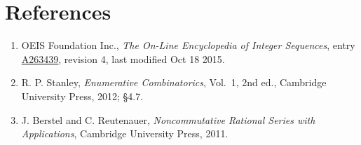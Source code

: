 \documentclass[11pt]{article}
\theoremstyle{definition}
\begin{document}
\section{References}

\begin{enumerate}

\item OEIS Foundation Inc., \emph{The On-Line Encyclopedia of Integer Sequences}, entry \href{https://oeis.org/A263439}{A263439}, revision 4, last modified Oct 18 2015.

\item R. P. Stanley, \emph{Enumerative Combinatorics}, Vol.~1, 2nd ed., Cambridge University Press, 2012; \S4.7.

\item J. Berstel and C. Reutenauer, \emph{Noncommutative Rational Series with Applications}, Cambridge University Press, 2011.

\end{enumerate}
\end{document}
